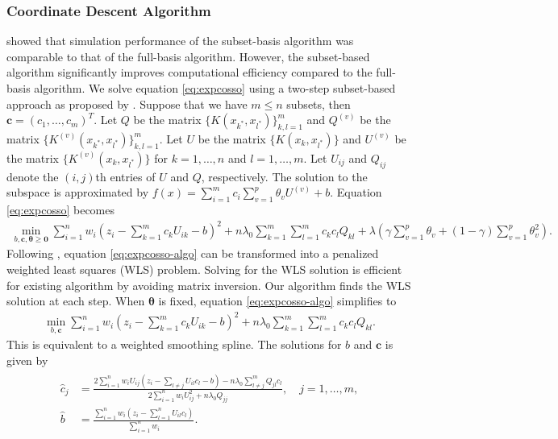 \hypertarget{coordinate-descent-algorithm}{%
\subsubsection{Coordinate Descent Algorithm}\label{coordinate-descent-algorithm}}

\citet{Lin:2006} showed that simulation performance of the subset-basis algorithm was comparable to that of the full-basis algorithm. However, the subset-based algorithm significantly improves computational efficiency compared to the full-basis algorithm. We solve equation \eqref{eq:expcosso} using a two-step subset-based approach as proposed by \citet{Lin:2006}.
Suppose that we have \(m \leq n\) subsets, then \(\pmb{c} = (c_1, \dots, c_m)^T\). Let \(Q\) be the matrix \(\{K(x_{k^*},x_{l^*})\}_{k,l=1}^{m}\) and \(Q^{(v)}\) be the matrix \(\{K^{(v)}(x_{k^*},x_{l^*})\}_{k,l=1}^{m}\). Let \(U\) be the matrix \(\{K(x_{k},x_{l^*})\}\) and \(U^{(v)}\) be the matrix \(\{K^{(v)}(x_{k},x_{l^*})\}\) for \(k=1,\dots, n\) and \(l=1,\dots, m\). Let \(U_{ij}\) and \(Q_{ij}\) denote the \((i,j)\)th entries of \(U\) and \(Q\), respectively. The solution to the subspace is approximated by \(f(x) = \sum_{i=1}^{m} c_i \sum_{v=1}^{p} \theta_v U^{(v)} + b\). Equation \eqref{eq:expcosso} becomes
\begin{align}
    \min_{b, \pmb{c}, \pmb{\theta} \geq \pmb{0}}
    \sum_{i=1}^{n}w_i \left( z_i - \sum_{k=1}^{m} c_k U_{ik} - b \right)^2 
    + n \lambda_0 \sum_{k=1}^{m} \sum_{l=1}^{m}c_k c_l Q_{kl}
    + \lambda \left(\gamma \sum_{v=1}^{p} \theta_v + (1-\gamma) \sum_{v=1}^{p} \theta_v^2 \right).
    \label{eq:expcosso-algo} 
\end{align}
Following \citet{Tibshirani:1996}, equation \eqref{eq:expcosso-algo} can be transformed into a penalized weighted least squares (WLS) problem. Solving for the WLS solution is efficient for existing algorithm by avoiding matrix inversion. Our algorithm finds the WLS solution at each step. When \(\pmb{\theta}\) is fixed, equation \eqref{eq:expcosso-algo} simplifies to
\begin{align}
    \min_{b, \pmb{c}} \sum_{i=1}^{n}w_i \left( z_i - \sum_{k=1}^{m} c_k U_{ik} - b \right)^2
    + n \lambda_0 \sum_{k=1}^{m} \sum_{l=1}^{m}c_k c_l Q_{kl}.
    \label{eq:expcosso-cstep-algo} 
\end{align}
This is equivalent to a weighted smoothing spline. The solutions for \(b\) and \(\pmb{c}\) is given by
\begin{align}
    \begin{split}
        \hat{c}_j &= \frac{2\sum_{i=1}^{n}w_i U_{ij}(z_i-\sum_{l \neq j}U_{il}c_{l}-b) - n\lambda_0 \sum_{l \neq j}^{m}Q_{jl}c_{l}}
                          {2\sum_{i=1}^{n}w_i U_{ij}^2 + n\lambda_0 Q_{jj}}, \quad j = 1,\dots, m, \\
        \hat{b} &= \frac{\sum_{i=1}^{n}w_i (z_i-\sum_{l=1}^{n}U_{il}c_{l})}{\sum_{i=1}^{n}w_i}.
    \end{split}
    \label{eq:expcosso-cstep-sol} 
\end{align}
